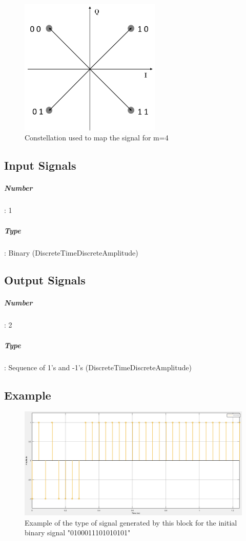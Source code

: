 \documentclass[a4paper]{article}
\begin{document}
\begin{figure}
	\centering
	\includegraphics[width=0.6\textwidth]{MQAM_constellation}
	
	\caption{Constellation used to map the signal for m=4 }\label{constellation}
	
\end{figure}  

\subsection*{Input Signals}

\subparagraph*{Number}: 1

\subparagraph*{Type}: Binary (DiscreteTimeDiscreteAmplitude)

\subsection*{Output Signals}

\subparagraph*{Number}: 2

\subparagraph*{Type}: Sequence of 1's and -1's (DiscreteTimeDiscreteAmplitude)

\subsection*{Example}

\begin{figure}
	\centering
	\includegraphics[width=\textwidth]{MQAM2_DeterministicAppendZeros}
	
	\caption{Example of the type of signal generated by this block for the initial binary signal "0100011101010101" }\label{DeterministicAppendZeros}

\end{figure}

\end{document}
